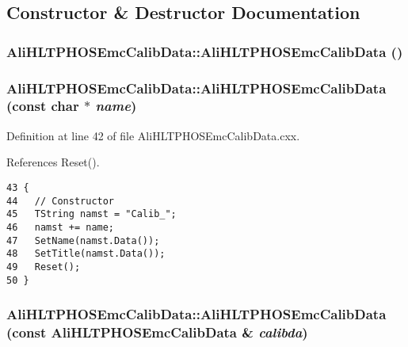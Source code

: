 \subsection{Constructor \& Destructor Documentation}
\subsubsection{\setlength{\rightskip}{0pt plus 5cm}Ali\-HLTPHOSEmc\-Calib\-Data::Ali\-HLTPHOSEmc\-Calib\-Data ()}\label{classAliHLTPHOSEmcCalibData_AliHLTPHOSEmcCalibDataa0}


\subsubsection{\setlength{\rightskip}{0pt plus 5cm}Ali\-HLTPHOSEmc\-Calib\-Data::Ali\-HLTPHOSEmc\-Calib\-Data (const char $\ast$ {\em name})}\label{classAliHLTPHOSEmcCalibData_AliHLTPHOSEmcCalibDataa1}




Definition at line 42 of file Ali\-HLTPHOSEmc\-Calib\-Data.cxx.

References Reset().

\footnotesize\begin{verbatim}43 {
44   // Constructor
45   TString namst = "Calib_";
46   namst += name;
47   SetName(namst.Data());
48   SetTitle(namst.Data());
49   Reset();
50 }
\end{verbatim}\normalsize 


\subsubsection{\setlength{\rightskip}{0pt plus 5cm}Ali\-HLTPHOSEmc\-Calib\-Data::Ali\-HLTPHOSEmc\-Calib\-Data (const {\bf Ali\-HLTPHOSEmc\-Calib\-Data} \& {\em calibda})}\label{classAliHLTPHOSEmcCalibData_AliHLTPHOSEmcCalibDataa2}




